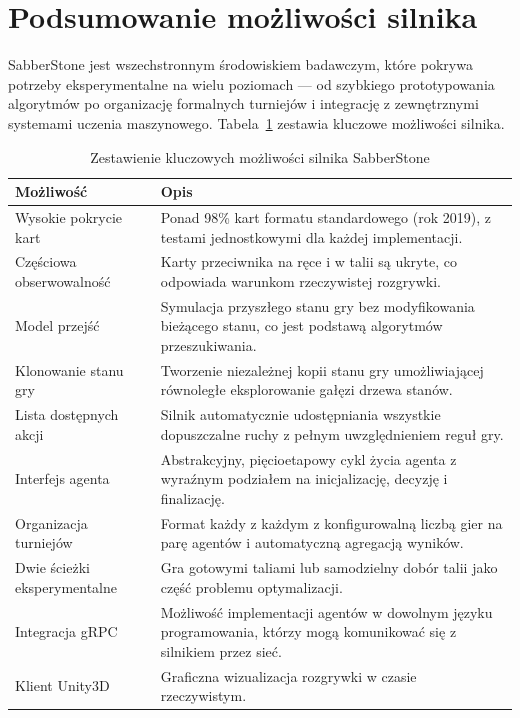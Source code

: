 \section{Podsumowanie możliwości silnika}

SabberStone jest wszechstronnym środowiskiem badawczym, które pokrywa potrzeby eksperymentalne na wielu poziomach --- od szybkiego prototypowania algorytmów po organizację formalnych turniejów i integrację z zewnętrznymi systemami uczenia maszynowego. Tabela~\ref{tab:sabber_summary} zestawia kluczowe możliwości silnika.

\begin{table}[ht]
\centering
\caption{Zestawienie kluczowych możliwości silnika SabberStone}
\label{tab:sabber_summary}
\begin{tabular}{p{5.2cm}p{8.3cm}}
\toprule
\textbf{Możliwość} & \textbf{Opis} \\
\midrule
Wysokie pokrycie kart
  & Ponad 98\% kart formatu standardowego (rok 2019), z testami jednostkowymi dla każdej implementacji. \\[4pt]
Częściowa obserwowalność
  & Karty przeciwnika na ręce i w talii są ukryte, co odpowiada warunkom rzeczywistej rozgrywki. \\[4pt]
Model przejść
  & Symulacja przyszłego stanu gry bez modyfikowania bieżącego stanu, co jest podstawą algorytmów przeszukiwania. \\[4pt]
Klonowanie stanu gry
  & Tworzenie niezależnej kopii stanu gry umożliwiającej równoległe eksplorowanie gałęzi drzewa stanów. \\[4pt]
Lista dostępnych akcji
  & Silnik automatycznie udostępniania wszystkie dopuszczalne ruchy z pełnym uwzględnieniem reguł gry. \\[4pt]
Interfejs agenta
  & Abstrakcyjny, pięcioetapowy cykl życia agenta z wyraźnym podziałem na inicjalizację, decyzję i finalizację. \\[4pt]
Organizacja turniejów
  & Format każdy z każdym z konfigurowalną liczbą gier na parę agentów i automatyczną agregacją wyników. \\[4pt]
Dwie ścieżki eksperymentalne
  & Gra gotowymi taliami lub samodzielny dobór talii jako część problemu optymalizacji. \\[4pt]
Integracja gRPC
  & Możliwość implementacji agentów w dowolnym języku programowania, którzy mogą komunikować się z silnikiem przez sieć. \\[4pt]
Klient Unity3D
  & Graficzna wizualizacja rozgrywki w czasie rzeczywistym. \\[4pt]

\bottomrule
\end{tabular}
\end{table}
